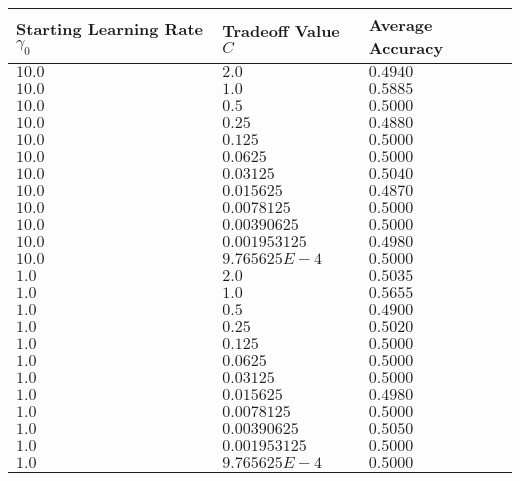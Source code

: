 \begin{enumerate}
\begin{longtable}{| p{}  |  p{} |p{}  |} 
      \hline
      Starting Learning Rate $\gamma_0$& Tradeoff Value $C$ & Average Accuracy  \\
      \hline
      $10.0$ & $2.0$ & $0.4940$ \\
      \hline
      $10.0$ & $1.0$ & $0.5885$ \\
      \hline
      $10.0$ & $0.5$ & $0.5000$ \\
      \hline
      $10.0$ & $0.25$ & $0.4880$ \\
      \hline
      $10.0$ & $0.125$ & $0.5000$ \\
      \hline
      $10.0$ & $0.0625$ & $0.5000$ \\
      \hline
      $10.0$ & $0.03125$ & $0.5040$ \\
      \hline
      $10.0$ & $0.015625$ & $0.4870$ \\
      \hline
      $10.0$ & $0.0078125$ & $0.5000$ \\
      \hline
      $10.0$ & $0.00390625$ & $0.5000$ \\
      \hline
      $10.0$ & $0.001953125$ & $0.4980$ \\
      \hline
      $10.0$ & $9.765625E-4$ & $0.5000$ \\
      \hline
      $1.0$ & $2.0$ & $0.5035$ \\
      \hline
      $1.0$ & $1.0$ & $0.5655$ \\
      \hline
      $1.0$ & $0.5$ & $0.4900$ \\
      \hline
      $1.0$ & $0.25$ & $0.5020$ \\
      \hline
      $1.0$ & $0.125$ & $0.5000$ \\
      \hline
      $1.0$ & $0.0625$ & $0.5000$ \\
      \hline
      $1.0$ & $0.03125$ & $0.5000$ \\
      \hline
      $1.0$ & $0.015625$ & $0.4980$ \\
      \hline
      $1.0$ & $0.0078125$ & $0.5000$ \\
      \hline
      $1.0$ & $0.00390625$ & $0.5050$ \\
      \hline
      $1.0$ & $0.001953125$ & $0.5000$ \\
      \hline
      $1.0$ & $9.765625E-4$ & $0.5000$ \\
      \hline
      

\end{longtable}
\end{enumerate}

